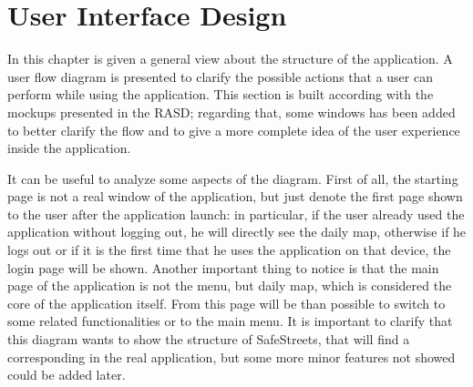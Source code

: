 \documentclass[../RASD.tex]{subfiles}
\begin{document}
    \chapter{User Interface Design}\label{ch:user-interface-design}
    In this chapter is given a general view about the structure of the application.
    A user flow diagram is presented to clarify the possible actions that a user can perform while using the application.
    This section is built according with the mockups presented in the RASD; regarding that, some windows has been added to better clarify
    the flow and to give a more complete idea of the user experience inside the application.
    \begin{figure}[H]
    \end{figure}
    It can be useful to analyze some aspects of the diagram.
    First of all, the starting page is not a real window of the application, but just denote the first page shown to the user after the application launch:
    in particular, if the user already used the application without logging out, he will directly see the daily map, otherwise if he logs out or if it is the first time
    that he uses the application on that device, the login page will be shown.
    Another important thing to notice is that the main page of the application is not the menu, but daily map, which is considered the core of the application itself.
    From this page will be than possible to switch to some related functionalities or to the main menu.
    It is important to clarify that this diagram wants to show the structure of SafeStreets, that will find a corresponding in the real application,
    but some more minor features not showed could be added later.
\end{document}
